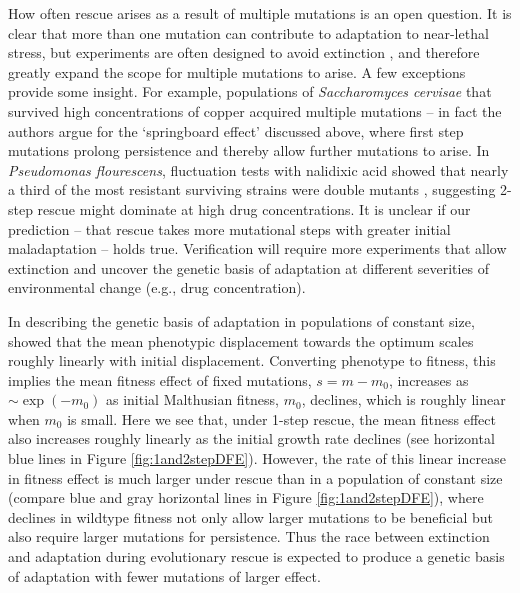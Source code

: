 \documentclass[9pt,twocolumn,twoside,lineno]{gsajnl}
\begin{document}
How often rescue arises as a result of multiple mutations is an open question. 
It is clear that more than one mutation can contribute to adaptation to near-lethal stress, but experiments are often designed to avoid extinction \citep[reviewed in][]{cowen2002evolution}, and therefore greatly expand the scope for multiple mutations to arise.
A few exceptions provide some insight.
For example, populations of \textit{Saccharomyces cervisae} that survived high concentrations of copper acquired multiple mutations \citep{Gerstein2015} -- in fact the authors argue for the `springboard effect' discussed above, where first step mutations prolong persistence and thereby allow further mutations to arise.
In \textit{Pseudomonas flourescens}, fluctuation tests with nalidixic acid showed that nearly a third of the most resistant surviving strains were double mutants \citep{Bataillon2011}, suggesting 2-step rescue might dominate at high drug concentrations.
It is unclear if our prediction --  that rescue takes more mutational steps with greater initial maladaptation -- holds true. 
Verification will require more experiments that allow extinction and uncover the genetic basis of adaptation at different severities of environmental change (e.g., drug concentration).

In describing the genetic basis of adaptation in populations of constant size, \cite{Orr1998} showed that the mean phenotypic displacement towards the optimum scales roughly linearly with initial displacement.
Converting phenotype to fitness, this implies the mean fitness effect of fixed mutations, $s=m-m_0$, increases as $\sim \exp(-m_0)$ as initial Malthusian fitness, $m_0$, declines, which is roughly linear when $m_0$ is small.
Here we see that, under 1-step rescue, the mean fitness effect also increases roughly linearly as the initial growth rate declines (see horizontal blue lines in Figure \ref{fig:1and2stepDFE}).
However, the rate of this linear increase in fitness effect is much larger under rescue than in a population of constant size (compare blue and gray horizontal lines in Figure \ref{fig:1and2stepDFE}), where declines in wildtype fitness not only allow larger mutations to be beneficial but also require larger mutations for persistence.
Thus the race between extinction and adaptation during evolutionary rescue is expected to produce a genetic basis of adaptation with fewer mutations of larger effect.
\end{document}
